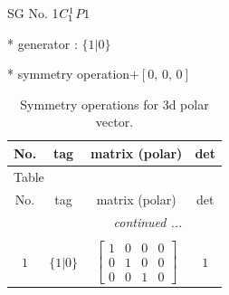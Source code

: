 \documentclass[fleqn,8pt]{jsarticle}
\begin{document}
\setcounter{MaxMatrixCols}{32}

\renewcommand{\tablename}{Table~}
\renewcommand{\figurename}{Figure~}
\begin{center}
\LARGE
SG No. 1\quad$C_{\rm 1}^{1}$\quad$P1$\quad[ triclinic ]
\end{center}

* generator : $\{1|0\}$

* symmetry operation\quad$+\left[ 0,\, 0,\, 0 \right]$
\renewcommand{\arraystretch}{1.3}
\begin{longtable}{cccc}
\caption{Symmetry operations for 3d polar vector.}
 \\
 \hline \hline
No. & tag & matrix (polar) & det \\ \hline \endfirsthead

\multicolumn{3}{l}{\tablename\ \thetable{}} \\
 \hline \hline
No. & tag & matrix (polar) & det \\ \hline \endhead

 \hline \hline
\multicolumn{3}{r}{\footnotesize\it continued ...} \\ \endfoot

 \hline \hline
\multicolumn{3}{r}{} \\ \endlastfoot

$ 1 $ & $ \{1|0\} $ & $ \begin{bmatrix} 1 & 0 & 0 & 0 \\ 0 & 1 & 0 & 0 \\ 0 & 0 & 1 & 0 \end{bmatrix} $ & $ 1 $ \\
\end{longtable}
\end{document}
